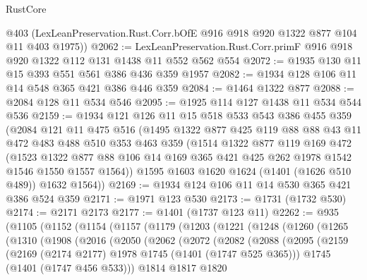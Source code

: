 \begin{lexlean}{RustCore}
\begin{coremodule}
      @403
      (LexLeanPreservation.Rust.Corr.bOfE @916 @918 @920 @1322 @877 @104 @11 @403 @1975))
@2062 := LexLeanPreservation.Rust.Corr.primF @916 @918 @920 @1322 @112 @131 @1438 @11 @552 @562 @554
@2072 := @1935 @130 @11 @15 @393 @551 @561 @386 @436 @359 @1957
@2082 := @1934 @128 @106 @11 @14 @548 @365 @421 @386 @446 @359
@2084 := @1464 @1322 @877
@2088 := @2084 @128 @11 @534 @546
@2095 := @1925 @114 @127 @1438 @11 @534 @544 @536
@2159 := @1934
    @121
    @126
    @11
    @15
    @518
    @533
    @543
    @386
    @455
    @359
    (@2084
      @121
      @11
      @475
      @516
      (@1495
        @1322
        @877
        @425
        @119
        @88
        @88
        @43
        @11
        @472
        @483
        @488
        @510
        @353
        @463
        @359
        (@1514
          @1322
          @877
          @119
          @169
          @472
          (@1523
            @1322
            @877
            @88
            @106
            @14
            @169
            @365
            @421
            @425
            @262
            @1978
            @1542
            @1546
            @1550
            @1557
            @1564))
        @1595
        @1603
        @1620
        @1624
        (@1401 (@1626 @510 @489))
        @1632
        @1564))
@2169 := @1934 @124 @106 @11 @14 @530 @365 @421 @386 @524 @359
@2171 := @1971 @123 @530
@2173 := @1731 (@1732 @530)
@2174 := @2171 @2173
@2177 := @1401 (@1737 @123 @11)
@2262 := @935
    (@1105
      (@1152
        (@1154
          (@1157
            (@1179
              (@1203
                (@1221
                  (@1248
                    (@1260
                      (@1265
                        (@1310
                          (@1908
                            (@2016
                              (@2050
                                (@2062
                                  (@2072
                                    (@2082
                                      (@2088
                                        (@2095
                                          (@2159
                                            (@2169
                                              (@2174 @2177)
                                              @1978
                                              @1745
                                              (@1401 (@1747 @525 @365)))
                                            @1745
                                            (@1401 (@1747 @456 @533)))
                                          @1814
                                          @1817
                                          @1820

\end{coremodule}
\end{lexlean}
